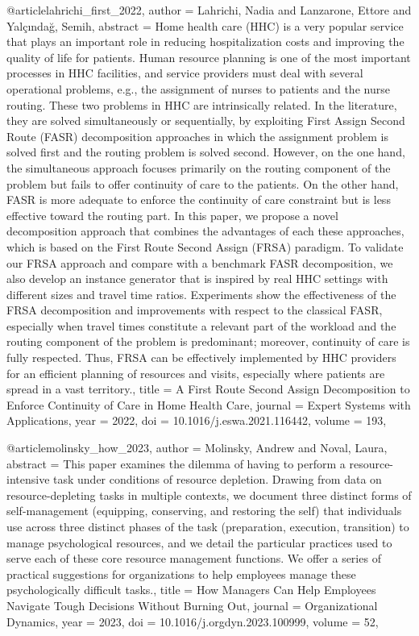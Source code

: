 @article{lahrichi_first_2022,
  author = {Lahrichi, Nadia and Lanzarone, Ettore and Yalçındağ, Semih},
  abstract = {Home health care (HHC) is a very popular service that plays an important role in reducing hospitalization costs and improving the quality of life for patients. Human resource planning is one of the most important processes in HHC facilities, and service providers must deal with several operational problems, e.g., the assignment of nurses to patients and the nurse routing. These two problems in HHC are intrinsically related. In the literature, they are solved simultaneously or sequentially, by exploiting First Assign Second Route (FASR) decomposition approaches in which the assignment problem is solved first and the routing problem is solved second. However, on the one hand, the simultaneous approach focuses primarily on the routing component of the problem but fails to offer continuity of care to the patients. On the other hand, FASR is more adequate to enforce the continuity of care constraint but is less effective toward the routing part. In this paper, we propose a novel decomposition approach that combines the advantages of each these approaches, which is based on the First Route Second Assign (FRSA) paradigm. To validate our FRSA approach and compare with a benchmark FASR decomposition, we also develop an instance generator that is inspired by real HHC settings with different sizes and travel time ratios. Experiments show the effectiveness of the FRSA decomposition and improvements with respect to the classical FASR, especially when travel times constitute a relevant part of the workload and the routing component of the problem is predominant; moreover, continuity of care is fully respected. Thus, FRSA can be effectively implemented by HHC providers for an efficient planning of resources and visits, especially where patients are spread in a vast territory.},
  title = {{A} {First} {Route} {Second} {Assign} {Decomposition} {to} {Enforce} {Continuity} {of} {Care} {in} {Home} {Health} {Care}},
  journal = {Expert Systems with Applications},
  year = {2022},
  doi = {10.1016/j.eswa.2021.116442},
  volume = {193},
}

@article{molinsky_how_2023,
  author = {Molinsky, Andrew and Noval, Laura},
  abstract = {This paper examines the dilemma of having to perform a resource-intensive task under conditions of resource depletion. Drawing from data on resource-depleting tasks in multiple contexts, we document three distinct forms of self-management (equipping, conserving, and restoring the self) that individuals use across three distinct phases of the task (preparation, execution, transition) to manage psychological resources, and we detail the particular practices used to serve each of these core resource management functions. We offer a series of practical suggestions for organizations to help employees manage these psychologically difficult tasks.},
  title = {{How} {Managers} {Can} {Help} {Employees} {Navigate} {Tough} {Decisions} {Without} {Burning} {Out}},
  journal = {Organizational Dynamics},
  year = {2023},
  doi = {10.1016/j.orgdyn.2023.100999},
  volume = {52},
}

